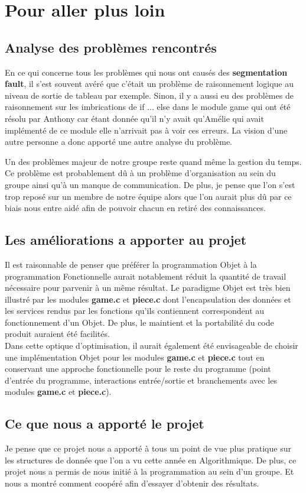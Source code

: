 \documentclass{report}
\begin{document}
\chapter{Pour aller plus loin}
\setcounter{section}{0}
\section{Analyse des problèmes rencontrés}
En ce qui concerne tous les problèmes qui nous ont causés des \textbf{segmentation fault}, il s'est souvent avéré que c'était un problème de raisonnement logique au niveau de sortie de tableau par exemple.
Sinon, il y a aussi eu des problèmes de raisonnement sur les imbrications de if ... else dans le module game qui ont été résolu par Anthony car étant donnée qu'il n'y avait qu'Amélie qui avait implémenté de ce module elle n'arrivait pas à voir ces erreurs. La vision d'une autre personne a donc apporté une autre analyse du problème.

Un des problèmes majeur de notre groupe reste quand même la gestion du temps. Ce problème est probablement dû à un problème d'organisation au sein du groupe ainsi qu'à un manque de communication. De plus, je pense que l'on s'est trop reposé sur un membre de notre équipe alors que l'on aurait plus dû par ce biais nous entre aidé afin de pouvoir chacun en retiré des connaissances.

\section{Les améliorations a apporter au projet}
Il est raisonnable de penser que préférer la programmation Objet à la programmation Fonctionnelle aurait notablement réduit la quantité de travail nécessaire pour parvenir à un même résultat.
Le paradigme Objet est très bien illustré par les modules \textbf{game.c} et \textbf{piece.c} dont l'encapsulation des données et les services rendus par les fonctions qu'ils contiennent correspondent au fonctionnement d'un Objet.
De plus, le maintient et la portabilité du code produit auraient été facilités.\\
Dans cette optique d'optimisation, il aurait également été envisageable de choisir une implémentation Objet pour les modules \textbf{game.c} et \textbf{piece.c} tout en conservant une approche fonctionnelle pour le reste du programme (point d'entrée du programme, interactions entrée/sortie et branchements avec les modules \textbf{game.c} et \textbf{piece.c}).

\section{Ce que nous a apporté le projet}

Je pense que ce projet nous a apporté à tous un point de vue plus pratique sur les structures de donnée que l'on a vu cette année en Algorithmique. De plus, ce projet nous a permis de nous initié à la programmation au sein d'un groupe. Et nous a montré comment coopéré afin d'essayer d'obtenir des résultats.
\end{document}
